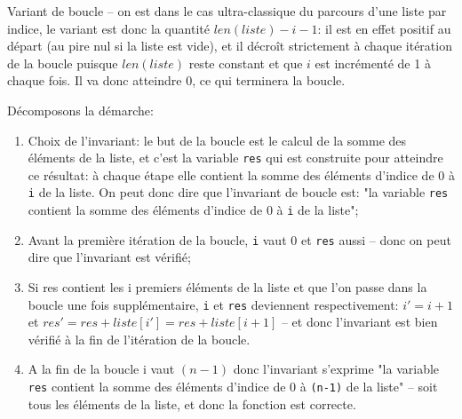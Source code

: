 \documentclass[12pt]{article}
\begin{document}
	\begin{MaReponse}
		\begin{alphenum}
			\item Variant de boucle -- on est dans le cas ultra-classique du parcours d'une liste par indice, le variant est donc la quantité $len(liste) - i - 1$: il est en effet positif au départ (au pire nul si la liste est vide), et il décroît strictement à chaque itération de la boucle puisque $len(liste)$ reste constant et que $i$ est incrémenté de 1 à chaque fois. Il va donc atteindre 0, ce qui terminera la boucle.
			\item Décomposons la démarche:
			\begin{enumerate}
				\item Choix de l'invariant: le but de la boucle est le calcul de la somme des éléments de la liste, et c'est la variable \texttt{res} qui est construite pour atteindre ce résultat: à chaque étape elle contient la somme des éléments d'indice de 0 à \texttt{i} de la liste. On peut donc dire que l'invariant de boucle est: "la variable \texttt{res} contient la somme des éléments d'indice de 0 à \texttt{i} de la liste";
				\item Avant la première itération de la boucle, \texttt{i} vaut 0 et \texttt{res} aussi -- donc on peut dire que l'invariant est vérifié;
				\item Si res contient les i premiers éléments de la liste et que l'on passe dans la boucle une fois supplémentaire, \texttt{i} et \texttt{res} deviennent respectivement: $i' = i + 1$ et $res' = res + liste[i'] = res + liste[i+1]$ -- et donc l'invariant est bien vérifié à la fin de l'itération de la boucle.
				\item A la fin de la boucle i vaut $(n-1)$ donc l'invariant s'exprime "la variable \texttt{res} contient la somme des éléments d'indice de 0 à \texttt{(n-1)} de la liste" -- soit tous les éléments de la liste, et donc la fonction est correcte.
			\end{enumerate}
		\end{alphenum}
	\end{MaReponse}
\end{document}

